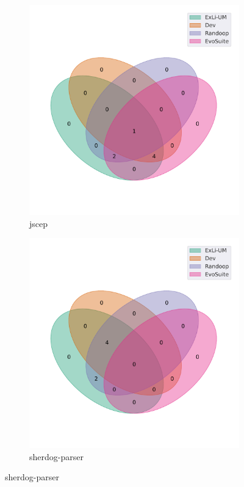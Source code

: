 \begin{figure}[t]\ContinuedFloat
\begin{subfigure}[b]{0.45\textwidth}
\includegraphics[width=\textwidth]{figures/venn/jscep_jscep-venn.pdf}
\vspace{-10pt}
\caption{jscep}
\label{fig:venn-jscep_jscep}
\end{subfigure}
\hfill
\begin{subfigure}[b]{0.45\textwidth}
\includegraphics[width=\textwidth]{figures/venn/lamarios_sherdog-parser-venn.pdf}
\vspace{-10pt}
\caption{sherdog-parser}
\label{fig:venn-lamarios_sherdog-parser}
\end{subfigure}
\end{figure}
